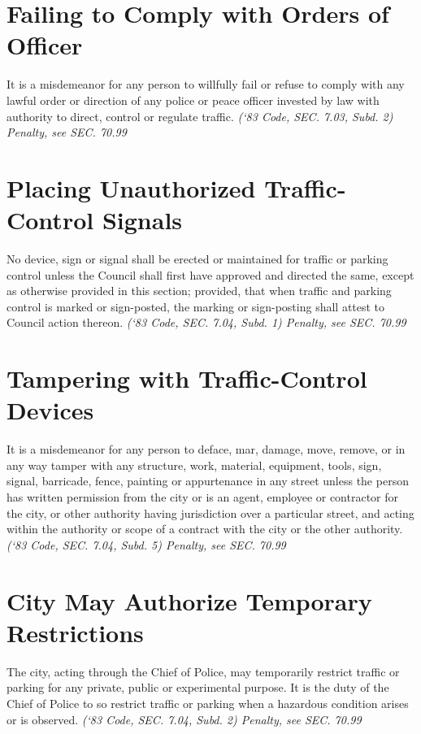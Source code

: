 \section{Failing to Comply with Orders of Officer}
It is a misdemeanor for any person to willfully fail or refuse to comply with any lawful order or direction of any police or peace officer invested by law with authority to direct, control or regulate traffic.\newline
\emph{(‘83 Code, SEC. 7.03, Subd. 2)  Penalty, see SEC. 70.99}
\section{Placing Unauthorized Traffic-Control Signals}
No device, sign or signal shall be erected or maintained for traffic or parking control unless the Council shall first have approved and directed the same, except as otherwise provided in this section; provided, that when traffic and parking control is marked or sign-posted, the marking or sign-posting shall attest to Council action thereon.\newline
\emph{(‘83 Code, SEC. 7.04, Subd. 1)  Penalty, see SEC. 70.99}
\section{Tampering with Traffic-Control Devices}
It is a misdemeanor for any person to deface, mar, damage, move, remove, or in any way tamper with any structure, work, material, equipment, tools, sign, signal, barricade, fence, painting or appurtenance in any street unless the person has written permission from the city or is an agent, employee or contractor for the city, or other authority having jurisdiction over a particular street, and acting within the authority or scope of a contract with the city or the other authority.\newline
\emph{(‘83 Code, SEC. 7.04, Subd. 5)  Penalty, see SEC. 70.99}
\section{City May Authorize Temporary Restrictions}
The city, acting through the Chief of Police, may temporarily restrict traffic or parking for any private, public or experimental purpose.  It is the duty of the Chief of Police to so restrict traffic or parking when a hazardous condition arises or is observed.\newline
\emph{(‘83 Code, SEC. 7.04, Subd. 2)  Penalty, see SEC. 70.99}

